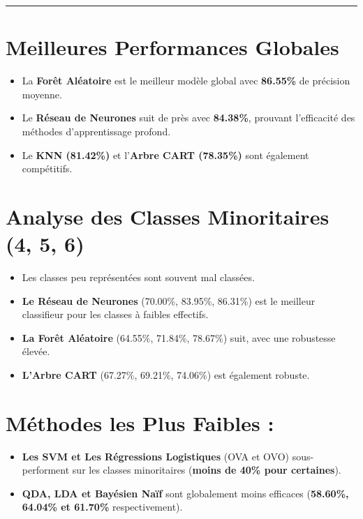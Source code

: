 \documentclass[
]{article}
\providecommand{\tightlist}{%
  \setlength{\itemsep}{0pt}\setlength{\parskip}{0pt}}\usepackage{longtable,booktabs,array}
\begin{document}
\begin{center}\rule{0.5\linewidth}{0.5pt}\end{center}

\section{Meilleures Performances
Globales}\label{meilleures-performances-globales}

\begin{itemize}
\tightlist
\item
  La \textbf{Forêt Aléatoire} est le meilleur modèle global avec
  \textbf{86.55\%} de précision moyenne.
\item
  Le \textbf{Réseau de Neurones} suit de près avec \textbf{84.38\%},
  prouvant l'efficacité des méthodes d'apprentissage profond.
\item
  Le \textbf{KNN (81.42\%)} et l'\textbf{Arbre CART (78.35\%)} sont
  également compétitifs.
\end{itemize}

\section{Analyse des Classes Minoritaires (4, 5,
6)}\label{analyse-des-classes-minoritaires-4-5-6}

\begin{itemize}
\tightlist
\item
  Les classes peu représentées sont souvent mal classées.
\item
  \textbf{Le Réseau de Neurones} (70.00\%, 83.95\%, 86.31\%) est le
  meilleur classifieur pour les classes à faibles effectifs.
\item
  \textbf{La Forêt Aléatoire} (64.55\%, 71.84\%, 78.67\%) suit, avec une
  robustesse élevée.
\item
  \textbf{L'Arbre CART} (67.27\%, 69.21\%, 74.06\%) est également
  robuste.
\end{itemize}

\section{Méthodes les Plus Faibles
:}\label{muxe9thodes-les-plus-faibles}

\begin{itemize}
\tightlist
\item
  \textbf{Les SVM et Les Régressions Logistiques} (OVA et OVO)
  sous-performent sur les classes minoritaires (\textbf{moins de 40\%
  pour certaines}).
\item
  \textbf{QDA, LDA et Bayésien Naïf} sont globalement moins efficaces
  (\textbf{58.60\%, 64.04\% et 61.70\%} respectivement).
\end{itemize}
\end{document}
